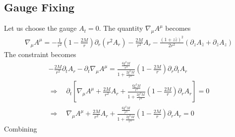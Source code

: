 \documentclass[12pt]{article}
\def\nn{\nonumber}
\begin{document}
\subsection{Gauge Fixing}
Let us choose the gauge $A_{t} =0$. The quantity $\nabla_{\mu} A^{\mu}$ becomes
\begin{gather}
\nabla_{\mu}A^{\mu}
=
-
\frac{1}{r^{2}}
(1 - \frac{2 M}{r})
\partial_{r}(r^{2} A_{r})
-
\frac{2 M}{r^{2}}
A_{r}
-
\frac{(1 + z \bar{z})^{2}}{2 r^{2}}
(\partial_{z} A_{\bar{z}} + \partial_{\bar{z}} A_{z})
\end{gather}
The constraint becomes
\begin{gather}
-
\frac{2 M}{r^{2}}
\partial_{t} A_{r}
-
\partial_{t}
\nabla_{\mu}
A^{\mu}
=
\frac{\frac{6 \xi^{2} M}{r^{3}} }{1 + \frac{2 \xi^{2} M}{r^{3}}}
(1 - \frac{2 M}{r})
\partial_{r} \partial_{t} A_{r}
\nn \\
\Rightarrow
\quad
\partial_{t} 
\left[
\nabla_{\mu}
A^{\mu}
+
\frac{2 M}{r^{2}}A_{r}
+
\frac{\frac{6 \xi^{2} M}{r^{3}} }{1 + \frac{2 \xi^{2} M}{r^{3}}}
(1 - \frac{2 M}{r})
\partial_{r} A_{r}
\right]=0
\nn \\
\Rightarrow
\quad
\nabla_{\mu}
A^{\mu}
+
\frac{2 M}{r^{2}}A_{r}
+
\frac{\frac{6 \xi^{2} M}{r^{3}} }{1 + \frac{2 \xi^{2} M}{r^{3}}}
(1 - \frac{2 M}{r})
\partial_{r} A_{r}
=0
\end{gather}
Combining 
\end{document}
